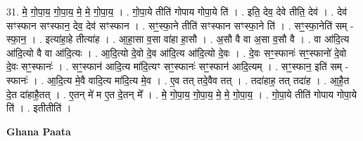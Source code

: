 \documentclass[17pt]{extarticle}
\begin{document}
31. मे॒ गो॒पा॒य॒ गो॒पा॒य॒ मे॒ मे॒ गो॒पा॒य॒ । . गो॒पा॒ये तीति॑ गोपाय गोपा॒ये ति॑ । . इति॒ देव॒ देवे तीति॒ देव॑ । . देव॑ सꣳस्फान सꣳस्फान॒ देव॒ देव॑ सꣳस्फान । . सꣳ॒॒स्फा॒ने तीति॑ सꣳस्फान सꣳस्फा॒ने ति॑ । . सꣳ॒॒स्फा॒नेति॑ सम् - स्फा॒न॒ । . इत्या॑हा॒हे तीत्या॑ह । . आ॒हा॒सा व॒सा वा॑हा हा॒सौ । . अ॒सौ वै वा अ॒सा व॒सौ वै । . वा आ॑दि॒त्य आ॑दि॒त्यो वै वा आ॑दि॒त्यः । . आ॒दि॒त्यो दे॒वो दे॒व आ॑दि॒त्य आ॑दि॒त्यो दे॒वः । . दे॒वः सꣳ॒॒स्फानः॑ सꣳ॒॒स्फानो॑ दे॒वो दे॒वः सꣳ॒॒स्फानः॑ । . सꣳ॒॒स्फान॑ आदि॒त्य मा॑दि॒त्यꣳ सꣳ॒॒स्फानः॑ सꣳ॒॒स्फान॑ आदि॒त्यम् । . सꣳ॒॒स्फान॒ इति॑ सम् - स्फानः॑ । . आ॒दि॒त्य मे॒वै वादि॒त्य मा॑दि॒त्य मे॒व । . ए॒व तत् तदे॒वैव तत् । . तदा॑हाह॒ तत् तदा॑ह । . आ॒है॒त दे॒त दा॑हाहै॒तत् । . ए॒तन् मे॑ म ए॒त दे॒तन् मे᳚ । . मे॒ गो॒पा॒य॒ गो॒पा॒य॒ मे॒ मे॒ गो॒पा॒य॒ । . गो॒पा॒ये तीति॑ गोपाय गोपा॒ये ति॑ । . इतीतीति॑ । \newline

\textbf{Ghana Paata } \newline
\end{document}

